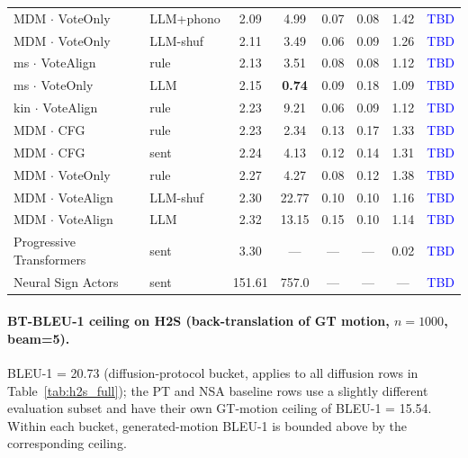 \documentclass{article}
\newcommand{\placeholder}[1]{\textcolor{blue}{#1}}
\begin{document}
\begin{table}[h]
\begin{tabular}{llcccccc}
    MDM $\cdot$ VoteOnly       & LLM+phono      & 2.09          & 4.99          & 0.07          & 0.08          & 1.42 & \placeholder{TBD} \\
    MDM $\cdot$ VoteOnly       & LLM-shuf       & 2.11          & 3.49          & 0.06          & 0.09          & 1.26 & \placeholder{TBD} \\
    ms $\cdot$ VoteAlign    & rule           & 2.13          & 3.51          & 0.08          & 0.08          & 1.12 & \placeholder{TBD} \\
    ms $\cdot$ VoteOnly        & LLM            & 2.15          & \textbf{0.74} & 0.09          & 0.18          & 1.09 & \placeholder{TBD} \\
    kin $\cdot$ VoteAlign   & rule           & 2.23          & 9.21          & 0.06          & 0.09          & 1.12 & \placeholder{TBD} \\
    MDM $\cdot$ CFG            & rule           & 2.23          & 2.34          & 0.13          & 0.17          & 1.33 & \placeholder{TBD} \\
    MDM $\cdot$ CFG            & sent           & 2.24          & 4.13          & 0.12          & 0.14          & 1.31 & \placeholder{TBD} \\
    MDM $\cdot$ VoteOnly       & rule           & 2.27          & 4.27          & 0.08          & 0.12          & 1.38 & \placeholder{TBD} \\
    MDM $\cdot$ VoteAlign   & LLM-shuf       & 2.30          & 22.77         & 0.10          & 0.10          & 1.16 & \placeholder{TBD} \\
    MDM $\cdot$ VoteAlign   & LLM            & 2.32          & 13.15         & 0.15          & 0.10          & 1.14 & \placeholder{TBD} \\
    \midrule
    Progressive Transformers & sent & 3.30 & --- & --- & --- & 0.02 & \placeholder{TBD} \\
    Neural Sign Actors       & sent & 151.61 & 757.0 & --- & --- & --- & \placeholder{TBD} \\
    \bottomrule
  \end{tabular}
\end{table}

\paragraph{BT-BLEU-1 ceiling on H2S (back-translation of GT motion, $n=1000$, beam=5).}
BLEU-1 = 20.73 (diffusion-protocol bucket, applies to all diffusion rows in Table~\ref{tab:h2s_full}); the PT and NSA baseline rows use a slightly different evaluation subset and have their own GT-motion ceiling of BLEU-1 = 15.54. Within each bucket, generated-motion BLEU-1 is bounded above by the corresponding ceiling.
\end{document}
